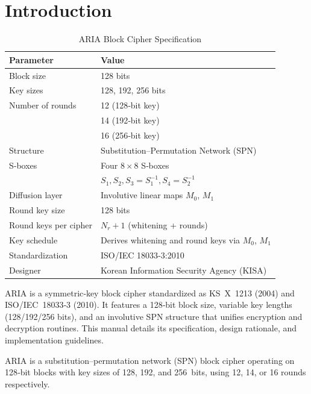\documentclass[11pt,a4paper]{report}
\begin{document}
\section{Introduction}
\begin{table}[ht]
	\centering
	\caption{ARIA Block Cipher Specification}
	\label{tab:aria-spec}
	\begin{tabular*}{\linewidth}{@{\extracolsep{\fill}}ll}
		\toprule[1.2pt]
		\textbf{Parameter}         & \textbf{Value} \\ 
		\midrule
		Block size                 & 128 bits \\ \hline
		Key sizes                  & 128, 192, 256 bits \\ \hline
		Number of rounds           & 12 (128‑bit key) \\
		& 14 (192‑bit key) \\
		& 16 (256‑bit key) \\ \hline
		Structure                  & Substitution–Permutation Network (SPN) \\ \hline
		S‑boxes                     & Four \(8\times8\) S‑boxes \\
		& \(S_1, S_2, S_3=S_1^{-1}, S_4=S_2^{-1}\) \\ \hline
		Diffusion layer            & Involutive linear maps \(M_0\), \(M_1\) \\ \hline
		Round key size             & 128 bits \\ \hline
		Round keys per cipher      & \(N_r + 1\) (whitening + rounds) \\ \hline
		Key schedule               & Derives whitening and round keys via \(M_0\), \(M_1\) \\ \hline
		Standardization            & ISO/IEC 18033‑3:2010 \\ \hline
		Designer                   & Korean Information Security Agency (KISA) \\
		\bottomrule[1.2pt]
	\end{tabular*}
\end{table}
ARIA is a symmetric‑key block cipher standardized as KS X 1213 (2004) and ISO/IEC 18033‑3 (2010). It features a 128‑bit block size, variable key lengths (128/192/256 bits), and an involutive SPN structure that unifies encryption and decryption routines. This manual details its specification, design rationale, and implementation guidelines.


ARIA is a substitution–permutation network (SPN) block cipher operating on 128‑bit blocks with key sizes of 128, 192, and 256 bits, using 12, 14, or 16 rounds respectively.
\end{document}
